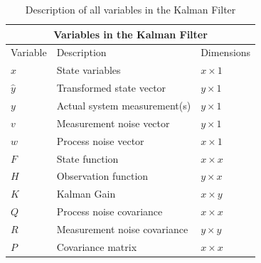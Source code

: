 \begin{center}
\begin{table}[h]
\centering
\caption{Description of all variables in the Kalman Filter} \label{tab:sometab}
\begin{tabular}{ |p{2cm}||p{5cm}|p{2cm}| }
    \hline
    \multicolumn{3}{|c|}{Variables in the Kalman Filter } \\ 
    \hline
    Variable & Description & Dimensions \\
    \hline
    $x$ & State variables  & $x \times 1$ \\
    $\hat y$ & Transformed state vector  & $y \times 1$ \\
    $y$ & Actual system measurement(s) & $y \times 1$ \\
    $v$ & Measurement noise vector & $y \times 1$\\
    $w$ & Process noise vector & $x \times 1$\\
    $F$ & State function  & $x \times x $  \\ 
    $H$ & Observation function & $y \times x$\\
    $K$ & Kalman Gain  & $x \times y$\\
    $Q$ & Process noise covariance  & $x \times x$ \\
    $R$ & Measurement noise covariance &  $y \times y$\\
    $P$ & Covariance matrix & $x \times x $  \\ 
    \hline
\end{tabular}
\end{table}
\label{tab:KF}
\end{center} 



